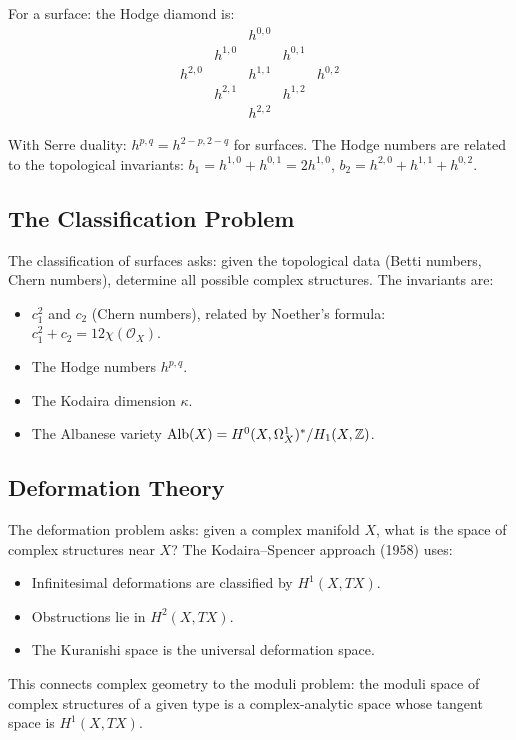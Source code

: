 For a surface: the Hodge diamond is:
\[
\begin{matrix}
& & h^{0,0} & & \\
& h^{1,0} & & h^{0,1} & \\
h^{2,0} & & h^{1,1} & & h^{0,2} \\
& h^{2,1} & & h^{1,2} & \\
& & h^{2,2} & &
\end{matrix}
\]

With Serre duality: $h^{p,q} = h^{2-p, 2-q}$ for surfaces. The Hodge numbers are related to the topological invariants:
$b_1 = h^{1,0} + h^{0,1} = 2h^{1,0}$, $b_2 = h^{2,0} + h^{1,1} + h^{0,2}$.

\subsection{The Classification Problem}

The classification of surfaces asks: given the topological data (Betti numbers, Chern numbers), determine all possible complex structures. The invariants are:
\begin{itemize}
    \item $c_1^2$ and $c_2$ (Chern numbers), related by Noether's formula: $c_1^2 + c_2 = 12 \chi(\mathcal{O}_X)$.
    \item The Hodge numbers $h^{p,q}$.
    \item The Kodaira dimension $\kappa$.
    \item The Albanese variety $\operatorname{Alb}(X) = H^0(X, \Omega^1_X)^* / H_1(X, \mathbb{Z})$.
\end{itemize}

\subsection{Deformation Theory}

The deformation problem asks: given a complex manifold $X$, what is the space of complex structures near $X$? The Kodaira--Spencer approach (1958) uses:
\begin{itemize}
    \item Infinitesimal deformations are classified by $H^1(X, TX)$.
    \item Obstructions lie in $H^2(X, TX)$.
    \item The Kuranishi space is the universal deformation space.
\end{itemize}

This connects complex geometry to the moduli problem: the moduli space of complex structures of a given type is a complex-analytic space whose tangent space is $H^1(X, TX)$.

